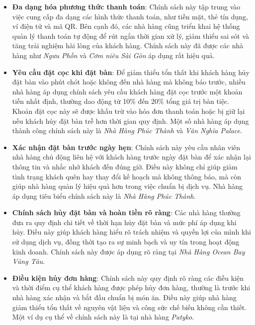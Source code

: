 \begin{itemize}
	\item \textbf{Đa dạng hóa phương thức thanh toán}: Chính sách này tập trung vào việc cung cấp đa dạng các hình thức thanh toán, như tiền mặt, thẻ tín dụng, ví điện tử và mã QR. Bên cạnh đó, các nhà hàng cũng triển khai hệ thống quản lý thanh toán tự động để rút ngắn thời gian xử lý, giảm thiểu sai sót và tăng trải nghiệm hài lòng của khách hàng. Chính sách này đã được các nhà hàng như \textit{Ngưu Phồn} và \textit{Cơm niêu Sài Gòn} áp dụng rất hiệu quả.

	\item \textbf{Yêu cầu đặt cọc khi đặt bàn}: Để giảm thiểu tổn thất khi khách hàng hủy đặt bàn vào phút chót hoặc không đến nhà hàng mà không báo trước, nhiều nhà hàng áp dụng chính sách yêu cầu khách hàng đặt cọc trước một khoản tiền nhất định, thường dao động từ 10\% đến 20\% tổng giá trị bàn tiệc. Khoản đặt cọc này sẽ được khấu trừ vào hóa đơn thanh toán hoặc bị giữ lại nếu khách hủy đặt bàn trễ hơn thời gian quy định. Một số nhà hàng áp dụng thành công chính sách này là \textit{Nhà Hàng Phúc Thành} và \textit{Vân Nghĩa Palace}.

	\item \textbf{Xác nhận đặt bàn trước ngày hẹn}: Chính sách này yêu cầu nhân viên nhà hàng chủ động liên hệ với khách hàng trước ngày đặt bàn để xác nhận lại thông tin và nhắc nhở khách đến đúng giờ. Điều này không chỉ giúp giảm tình trạng khách quên hay thay đổi kế hoạch mà không thông báo, mà còn giúp nhà hàng quản lý hiệu quả hơn trong việc chuẩn bị dịch vụ. Nhà hàng áp dụng tiêu biểu chính sách này là \textit{Nhà Hàng Phúc Thành}.

	\item \textbf{Chính sách hủy đặt bàn và hoàn tiền rõ ràng}: Các nhà hàng thường đưa ra quy định chi tiết về thời hạn hủy đặt bàn và mức phí áp dụng khi hủy. Điều này giúp khách hàng hiểu rõ trách nhiệm và quyền lợi của mình khi sử dụng dịch vụ, đồng thời tạo ra sự minh bạch và uy tín trong hoạt động kinh doanh. Chính sách này được áp dụng rõ ràng tại \textit{Nhà Hàng Ocean Bay Vũng Tàu}.

	\item \textbf{Điều kiện hủy đơn hàng}: Chính sách này quy định rõ ràng các điều kiện và thời điểm cụ thể khách hàng được phép hủy đơn hàng, thường là trước khi nhà hàng xác nhận và bắt đầu chuẩn bị món ăn. Điều này giúp nhà hàng giảm thiểu tổn thất về nguyên vật liệu và công sức chế biến không cần thiết. Một ví dụ cụ thể về chính sách này là tại nhà hàng \textit{Patyko}.


\end{itemize}
